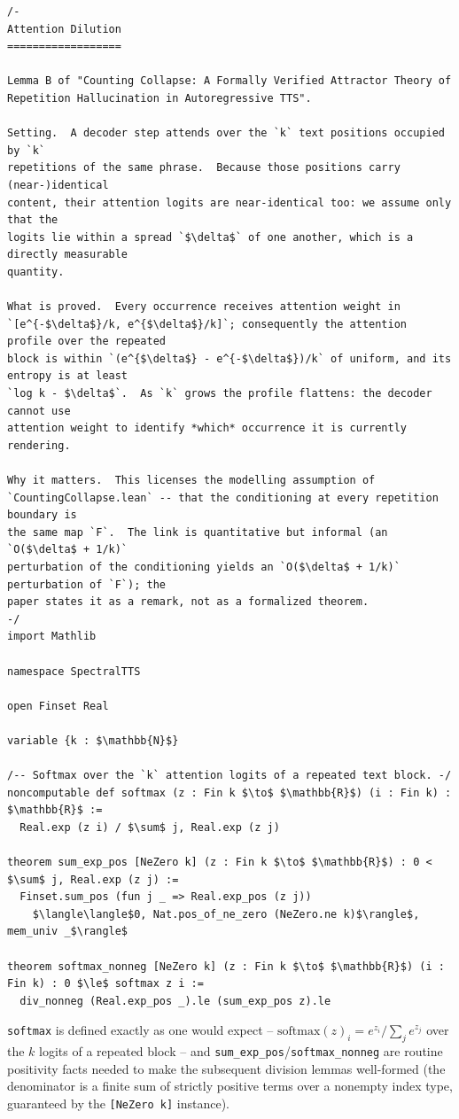 \documentclass[11pt]{article}
\begin{document}
\begin{lstlisting}
/-
Attention Dilution
==================

Lemma B of "Counting Collapse: A Formally Verified Attractor Theory of
Repetition Hallucination in Autoregressive TTS".

Setting.  A decoder step attends over the `k` text positions occupied by `k`
repetitions of the same phrase.  Because those positions carry (near-)identical
content, their attention logits are near-identical too: we assume only that the
logits lie within a spread `$\delta$` of one another, which is a directly measurable
quantity.

What is proved.  Every occurrence receives attention weight in
`[e^{-$\delta$}/k, e^{$\delta$}/k]`; consequently the attention profile over the repeated
block is within `(e^{$\delta$} - e^{-$\delta$})/k` of uniform, and its entropy is at least
`log k - $\delta$`.  As `k` grows the profile flattens: the decoder cannot use
attention weight to identify *which* occurrence it is currently rendering.

Why it matters.  This licenses the modelling assumption of
`CountingCollapse.lean` -- that the conditioning at every repetition boundary is
the same map `F`.  The link is quantitative but informal (an `O($\delta$ + 1/k)`
perturbation of the conditioning yields an `O($\delta$ + 1/k)` perturbation of `F`); the
paper states it as a remark, not as a formalized theorem.
-/
import Mathlib

namespace SpectralTTS

open Finset Real

variable {k : $\mathbb{N}$}

/-- Softmax over the `k` attention logits of a repeated text block. -/
noncomputable def softmax (z : Fin k $\to$ $\mathbb{R}$) (i : Fin k) : $\mathbb{R}$ :=
  Real.exp (z i) / $\sum$ j, Real.exp (z j)

theorem sum_exp_pos [NeZero k] (z : Fin k $\to$ $\mathbb{R}$) : 0 < $\sum$ j, Real.exp (z j) :=
  Finset.sum_pos (fun j _ => Real.exp_pos (z j))
    $\langle\langle$0, Nat.pos_of_ne_zero (NeZero.ne k)$\rangle$, mem_univ _$\rangle$

theorem softmax_nonneg [NeZero k] (z : Fin k $\to$ $\mathbb{R}$) (i : Fin k) : 0 $\le$ softmax z i :=
  div_nonneg (Real.exp_pos _).le (sum_exp_pos z).le
\end{lstlisting}

\texttt{softmax} is defined exactly as one would expect --
$\mathrm{softmax}(z)_i = e^{z_i}/\sum_j e^{z_j}$ over the $k$ logits of a
repeated block -- and \texttt{sum\_exp\_pos}/\texttt{softmax\_nonneg} are
routine positivity facts needed to make the subsequent division lemmas
well-formed (the denominator is a finite sum of strictly positive terms over a
nonempty index type, guaranteed by the \texttt{[NeZero k]} instance).
\end{document}
